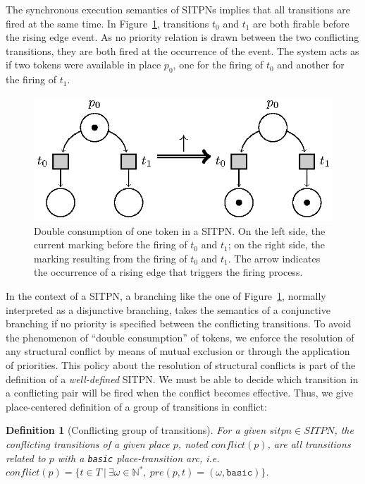 \documentclass[pdflatex,sn-mathphys]{sn-jnl}%
\theoremstyle{thmstyleone}%
\theoremstyle{thmstyletwo}%
\theoremstyle{thmstylethree}%
\newtheorem{definition}{Definition}%
\begin{document}
The synchronous execution semantics of SITPNs implies that all
transitions are fired at the same time. In
Figure~\ref{fig:double-consum}, transitions $t_0$ and $t_1$ are both
firable before the rising edge event. As no priority relation is drawn
between the two conflicting transitions, they are both fired at the
occurrence of the event. The system acts as if two tokens were
available in place $p_0$, one for the firing of $t_0$ and another for
the firing of $t_1$.

\begin{figure}[H]
  \centering
  \includegraphics[keepaspectratio=true, width=.5\textwidth]{double-consum.eps}
  \caption[Double consumption of token in a SITPN.]{Double consumption
    of one token in a SITPN. On the left side, the current marking
    before the firing of $t_0$ and $t_1$; on the right side, the
    marking resulting from the firing of $t_0$ and $t_1$. The arrow
    indicates the occurrence of a rising edge that triggers the firing
    process.}
  \label{fig:double-consum}
\end{figure}

In the context of a SITPN, a branching like the one of
Figure~\ref{fig:double-consum}, normally interpreted as a disjunctive
branching, takes the semantics of a conjunctive branching if no
priority is specified between the conflicting transitions. To avoid
the phenomenon of ``double consumption'' of tokens, we enforce the
resolution of any structural conflict by means of mutual exclusion or
through the application of priorities. This policy about the
resolution of structural conflicts is part of the definition of a
\emph{well-defined} SITPN. We must be able to decide which transition
in a conflicting pair will be fired when the conflict becomes
effective. Thus, we give place-centered definition of a group of
transitions in conflict:

\begin{definition}[Conflicting group of transitions]
  \label{def:cgroup}
  For a given $sitpn\in{}SITPN$, the conflicting transitions of a
  given place $p$, noted $conflict(p)$, are all transitions related to
  $p$ with a \texttt{basic} place-transition arc,
  i.e.
  $conflict(p)=\{t\in{}T~\vert~\exists{}\omega\in\mathbb{N}^{*},~pre(p,t)=(\omega,\mathtt{basic})\}$.
\end{definition}
\end{document}
